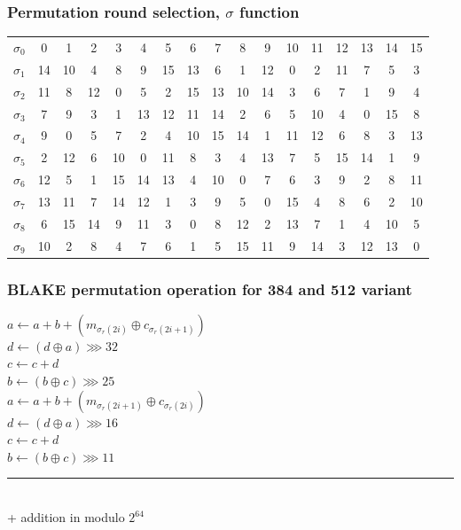 \documentclass{beamer}
\begin{document}
\begin{frame}
\frametitle{Permutation round selection, $\sigma$ function\footnotemark}
  \resizebox{\linewidth}{!} {
    \begin{tabular}{ c| *{16}{c}} \hline
      $\sigma_{0}$ & 0  & 1  & 2  & 3  & 4  & 5  & 6  & 7  & 8  & 9  & 10 & 11 & 12 & 13 & 14 & 15 \\
      $\sigma_{1}$ & 14 & 10 & 4  & 8  & 9  & 15 & 13 & 6  & 1  & 12 & 0  & 2  & 11 & 7  & 5  & 3  \\
      $\sigma_{2}$ & 11 & 8  & 12 & 0  & 5  & 2  & 15 & 13 & 10 & 14 & 3  & 6  & 7  & 1  & 9  & 4  \\
      $\sigma_{3}$ & 7  & 9  & 3  & 1  & 13 & 12 & 11 & 14 & 2  & 6  & 5  & 10 & 4  & 0  & 15 & 8  \\
      $\sigma_{4}$ & 9  & 0  & 5  & 7  & 2  & 4  & 10 & 15 & 14 & 1  & 11 & 12 & 6  & 8  & 3  & 13 \\
      $\sigma_{5}$ & 2  & 12 & 6  & 10 & 0  & 11 & 8  & 3  & 4  & 13 & 7  & 5  & 15 & 14 & 1  & 9  \\
      $\sigma_{6}$ & 12 & 5  & 1  & 15 & 14 & 13 & 4  & 10 & 0  & 7  & 6  & 3  & 9  & 2  & 8  & 11 \\
      $\sigma_{7}$ & 13 & 11 & 7  & 14 & 12 & 1  & 3  & 9  & 5  & 0  & 15 & 4  & 8  & 6  & 2  & 10 \\
      $\sigma_{8}$ & 6  & 15 & 14 & 9  & 11 & 3  & 0  & 8  & 12 & 2  & 13 & 7  & 1  & 4  & 10 & 5  \\
      $\sigma_{9}$ & 10 & 2  & 8  & 4  & 7  & 6  & 1  & 5  & 15 & 11 & 9  & 14 & 3  & 12 & 13 & 0  \\ \hline
    \end{tabular}
  }
\end{frame}

\begin{frame}
\frametitle{BLAKE permutation operation for 384 and 512 variant}
$a \gets a + b + (m_{\sigma_{r}(2i)} \oplus c_{\sigma_{r}(2i + 1)})$ \\
$d \gets (d \oplus a) \ggg 32$ \\
$c \gets c + d$ \\
$b \gets (b \oplus c) \ggg 25$ \\
$a \gets a + b + (m_{\sigma_{r}(2i + 1)} \oplus c_{\sigma_{r}(2i)})$ \\
$d \gets (d \oplus a) \ggg 16$ \\
$c \gets c + d$ \\
$b \gets (b \oplus c) \ggg 11$ \\
\noindent\rule{10cm}{0.4pt} \\
\vspace{1mm}
+ addition in modulo $2^{64}$ \\
\end{frame}
\end{document}
